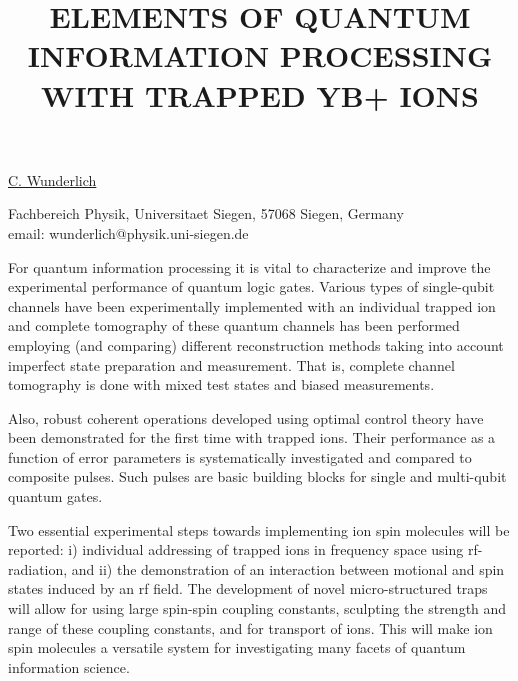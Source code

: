 \title{ELEMENTS OF QUANTUM INFORMATION PROCESSING WITH TRAPPED YB+ IONS}

\underline{C. Wunderlich}


Fachbereich Physik,
Universitaet Siegen,
57068 Siegen,
Germany\\
email: wunderlich@physik.uni-siegen.de

For quantum information processing it is vital to characterize and
improve the experimental performance of quantum logic gates. Various
types of single-qubit channels have been experimentally implemented
with an individual trapped ion and complete tomography of these
quantum channels has been performed employing (and comparing) different
reconstruction methods taking into account imperfect state preparation and measurement. 
That is, complete channel tomography is done with mixed test states and
biased measurements.

Also, robust coherent operations developed using optimal control theory have been
demonstrated for the first time with trapped ions. Their performance as a function
of error parameters is systematically investigated and compared to composite pulses.
Such pulses are basic building blocks for single and multi-qubit quantum
gates.

Two essential experimental steps towards implementing ion spin
molecules will be reported: i) individual addressing of trapped ions
in frequency space using rf-radiation, and ii) the demonstration of
an interaction between motional and spin states induced by an rf
field. The development of novel micro-structured traps will allow
for using large spin-spin coupling constants, sculpting the strength
and range of these coupling constants, and for transport of ions.
This will make ion spin molecules a versatile system for
investigating many facets of quantum information science.

\vspace{\baselineskip}
